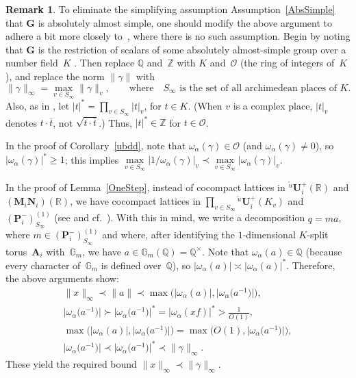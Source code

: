 \documentclass[pdftex]{sigma}
\newcommand{\GG}{\mathbb{G}}
\newcommand{\QQ}{\mathbb{Q}}
\newcommand{\RR}{\mathbb{R}}
\newcommand{\ZZ}{\mathbb{Z}}
\newcommand{\Aa}{\mathbf{A}}
\newcommand{\Ga}{\mathbf{G}}
\newcommand{\Ma}{\mathbf{M}}
\newcommand{\Na}{\mathbf{N}}
\newcommand{\Pa}{\mathbf{P}}
\newcommand{\Ua}{\mathbf{U}}
\newcommand{\ints}{\mathcal{O}}
\numberwithin{equation}{section}
\theoremstyle{definition}
\newtheorem{rem}[thm]{Remark}
\begin{document}
\begin{rem} \label{ChangeForK}To eliminate the simplifying assumption Assumption~\ref{AbsSimple} that $\Ga$ is absolutely almost simple, one should modify the above argument to adhere a bit more closely to~\cite{MR1828742}, where there is no such assumption.
Begin by noting that $\Ga$ is the restriction of scalars of some absolutely almost-simple group over a number field~$K$ \cite[paragraph~6.21(ii), p.~113]{BorelTits-GrpRed}. Then replace $\QQ$ and~$\ZZ$ with $K$ and~$\ints$ (the ring of integers of~$K$), and replace the norm $\|\gamma\|$ with
	\[ \|\gamma\|_\infty = \max_{v \in S_\infty} \| \gamma\|_v , \qquad \text{where} \quad \text{$S_\infty$ is the set of all archimedean places of~$K$.} \]
Also, as in \cite[p.~35]{MR1828742}, let
	$|t|^* = \prod\limits_{v \in S_\infty} |t|_v$, for $t \in K$.
(When $v$ is a complex place, $|t|_v$ denotes $t \cdot \overline{t}$, not $\sqrt{t \cdot \overline{t}}$.)
Thus, $|t|^* \in \ZZ$ for $t \in \ints$.

In the proof of Corollary~\ref{ubdd}, note that $\omega_\alpha(\gamma) \in \ints$ (and $\omega_\alpha(\gamma) \neq 0$), so $|\omega_\alpha(\gamma)|^* \ge 1$; this implies $\max\limits_{v \in S_\infty} |1/\omega_\alpha(\gamma) |_v \prec \max\limits_{v \in S_\infty} | \omega_\alpha(\gamma) |_v$.

In the proof of Lemma~\ref{OneStep}, instead of cocompact lattices in ${}^{\overleftarrow{u}}\Ua^+_i(\RR)$ and $(\Ma_i \Na_i)(\RR)$, we have cocompact lattices in $\prod\limits_{v \in S_\infty} {}^{\overleftarrow{u}}\Ua^+_i(K_v)$ and $(\Pa_i^-)_{S_\infty}^{(1)}$ (see \cite[Theorem~5.7(2), p.~268]{MR1278263} and cf.\ \cite[Theorem~5.7, p.~264]{MR1278263}). With this in mind, we write a decomposition $q = ma$, where $m \in (\Pa_i^-)_{S_\infty}^{(1)}$ and where, after identifying the $1$-dimensional $K$-split torus~$\Aa_i$ with~$\GG_m$, we have $a \in \GG_m(\QQ) = \QQ^\times$. Note that $\omega_\alpha(a) \in \QQ$ (because every character of~$\GG_m$ is defined over~$\QQ$), so
	$|\omega_\alpha(a)| \asymp |\omega_\alpha(a)|^*$.
Therefore, the above arguments show:
	\begin{gather*}
	\|x\|_\infty \prec \|a\| \prec \max \bigl( |\omega_\alpha(a)|, \big|\omega_\alpha\big(a^{-1}\big)\big| \bigr) , \\
	\big|\omega_\alpha\big(a^{-1}\big)\big| \succ \big|\omega_\alpha\big(a^{-1}\big)\big|^* = |\omega_\alpha(x f)|^* > \frac{1}{O(1)} , \\
	 \max \bigl( |\omega_\alpha(a)|, \big|\omega_\alpha\big(a^{-1}\big)\big|\bigr) = \max \bigl( O(1), \big|\omega_\alpha\big(a^{-1}\big)\big| \bigr) , \\
	 \big|\omega_\alpha\big(a^{-1}\big)\big| \prec \big|\omega_\alpha\big(a^{-1}\big)\big| ^* \prec \| \gamma \|_\infty
	. \end{gather*}
These yield the required bound $\|x\|_\infty \prec \| \gamma \|_\infty$.
\end{rem}
\end{document}
